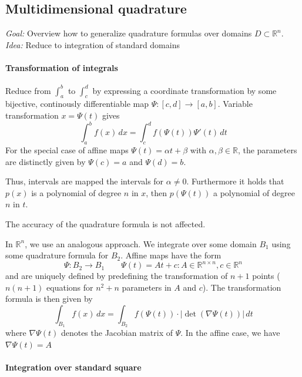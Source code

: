 \documentclass[a4paper]{article}
\numberwithin{lecref}{section}
\theoremstyle{break}
\newcommand{\Abs}[1]{\left|#1\right|}
\begin{document}
\subsection{Multidimensional quadrature}

\emph{Goal:} Overview how to generalize quadrature formulas over domains $D \subset \mathbb R^n$. \\
\emph{Idea:} Reduce to integration of standard domains

\paragraph{Transformation of integrals}

Reduce from $\int_a^b$ to $\int_c^d$ by expressing a coordinate transformation by some bijective, continously differentiable map $\Psi: [c, d] \to [a, b]$. Variable transformation $x = \Psi(t)$ gives 
\[ \int_a^b f(x) \, dx = \int_c^d f(\Psi(t)) \Psi'(t) \, dt \]
For the special case of affine maps $\Psi(t) = \alpha t + \beta$ with $\alpha, \beta \in \mathbb R$, the parameters are distinctly given by $\Psi(c) = a$ and $\Psi(d) = b$.

Thus, intervals are mapped the intervals for $\alpha \neq 0$. Furthermore it holds that $p(x)$ is a polynomial of degree $n$ in $x$, then $p(\Psi(t))$ a polynomial of degree $n$ in $t$.

The accuracy of the quadrature formula is not affected.

In $\mathbb R^n$, we use an analogous approach. We integrate over some domain $B_1$ using some quadrature formula for $B_2$. Affine maps have the form
\[  \Psi: B_2 \to B_1 \qquad \Psi(t) = At + c: A \in \mathbb R^{n \times n}, c \in \mathbb R^{n} \]
and are uniquely defined by predefining the transformation of $n+1$ points ($n(n+1)$ equations for $n^2 + n$ parameters in $A$ and $c$). The transformation formula is then given by
\[ \int_{B_1} f(x) \, dx = \int_{B_2} f(\Psi(t)) \cdot \Abs{\det(\nabla \Psi(t))} \, dt \]
where $\nabla \Psi(t)$ denotes the Jacobian matrix of $\Psi$. In the affine case, we have $\nabla \Psi(t) = A$

\paragraph{Integration over standard square}
\end{document}
